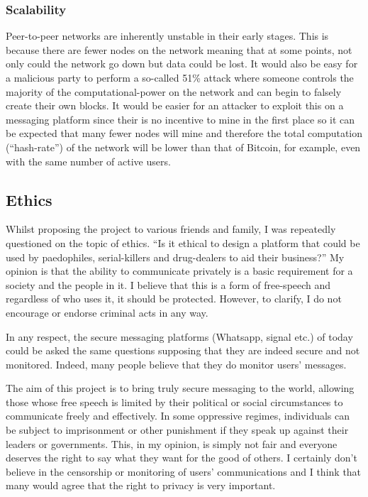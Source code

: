 \documentclass{article}
\begin{document}
\subsubsection{Scalability}
Peer-to-peer networks are inherently unstable in their early stages. This is because there are fewer nodes on the network meaning that at some points, not only could the network go down but data could be lost. It would also be easy for a malicious party to perform a so-called 51\% attack where someone controls the majority of the computational-power on the network and can begin to falsely create their own blocks. It would be easier for an attacker to exploit this on a messaging platform since their is no incentive to mine in the first place so it can be expected that many fewer nodes will mine and therefore the total computation (``hash-rate'') of the network will be lower than that of Bitcoin, for example, even with the same number of active users.

\subsection{Ethics}
Whilst proposing the project to various friends and family, I was repeatedly questioned on the topic of ethics. ``Is it ethical to design a platform that could be used by paedophiles, serial-killers and drug-dealers to aid their business?'' My opinion is that the ability to communicate privately is a basic requirement for a society and the people in it. I believe that this is a form of free-speech and regardless of who uses it, it should be protected. However, to clarify, I do not encourage or endorse criminal acts in any way.

In any respect, the secure messaging platforms (Whatsapp, signal etc.) of today could be asked the same questions supposing that they are indeed secure and not monitored. Indeed, many people believe that they do monitor users' messages\cite{whatsapp_endtoend}\cite{facebook_nsa}\cite{fbmsg_nsa_criminal}.

The aim of this project is to bring truly secure messaging to the world, allowing those whose free speech is limited by their political or social circumstances to communicate freely and effectively. In some oppressive regimes, individuals can be subject to imprisonment or other punishment if they speak up against their leaders or governments. This, in my opinion, is simply not fair and everyone deserves the right to say what they want for the good of others. I certainly don't believe in the censorship or monitoring of users' communications and I think that many would agree that the right to privacy is very important.
\end{document}
